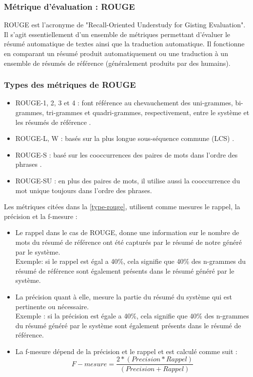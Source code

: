 \subsubsection{Métrique d'évaluation : ROUGE\label{metrique-eval}}
ROUGE est l'acronyme de "Recall-Oriented Understudy for Gisting Evaluation". Il s'agit essentiellement d'un ensemble de métriques permettant d'évaluer le résumé automatique de textes ainsi que la traduction automatique. Il fonctionne en comparant un résumé produit automatiquement ou une traduction à un ensemble de résumés de référence (généralement produits par des humains). \cite{rouge0}

\subsubsection{Types des métriques de ROUGE\label{type-rouge}}
\begin{itemize}
    \item{ROUGE-1, 2, 3 et 4 : font référence au chevauchement des uni-grammes, bi-grammes, tri-grammes et quadri-grammes, respectivement, entre le système et les résumés de référence \cite{rouge1}.}\\
    \item{ROUGE-L, W : basés sur la plus longue sous-séquence commune (LCS) \cite{rouge2}.}\\
    \item{ROUGE-S : basé sur les cooccurrences des paires de mots dans l'ordre des phrases \cite{rouge2}.}\\
    \item{ROUGE-SU : en plus des paires de mots, il utilise aussi la cooccurrence du mot unique toujours dans l'ordre des phrases.}
\end{itemize}

Les métriques citées dans la \autoref{type-rouge}, utilisent comme mesures le rappel, la précision et la f-mesure :  
\begin{itemize}
    
    \item {Le rappel dans le cas de ROUGE, donne une information sur le nombre de mots du résumé de référence ont été capturés par le résumé de notre généré par le système.\\ 
        Exemple: si le rappel est égal a 40\%, cela signifie que 40\% des n-grammes du résumé de référence sont également présents dans le résumé généré par le système.}\\
    \item {La précision quant à elle, mesure la partie du résumé du système qui est pertinente ou nécessaire.\\ 
        Exemple : si la précision est égale a 40\%, cela signifie que 40\% des n-grammes du résumé généré par le système sont également présents dans le résumé de référence.}
    \item {La f-mesure dépend de la précision et le rappel et est calculé comme suit :\\
                        \[ F-mesure = \frac{2 * (Precision * Rappel)} {(Precision + Rappel)} \]}

\end{itemize}

